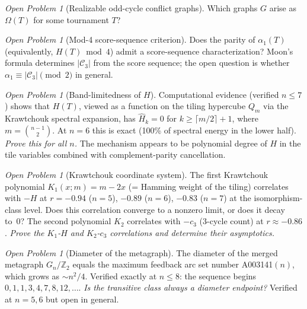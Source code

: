 \documentclass[12pt,reqno]{amsart}
\theoremstyle{plain}
\theoremstyle{definition}
\theoremstyle{remark}
\newtheorem{openquestion}[theorem]{Open Problem}
\begin{document}
\begin{openquestion}[Realizable odd-cycle conflict graphs]\label{oq:realizable}
Which graphs $G$ arise as $\Omega(T)$ for some tournament $T$?
\end{openquestion}

\begin{openquestion}[Mod-4 score-sequence criterion]\label{oq:mod4_struct}
Does the parity of $\alpha_1(T)$ (equivalently, $H(T) \bmod 4$) admit a
score-sequence characterization? Moon's formula determines $|\mathcal{C}_3|$
from the score sequence; the open question is whether
$\alpha_1 \equiv |\mathcal{C}_3| \pmod2$ in general.
\end{openquestion}

\begin{openquestion}[Band-limitedness of $H$]\label{oq:bandlimited}
Computational evidence (verified $n \leq 7$) shows that $H(T)$, viewed as a
function on the tiling hypercube $Q_m$ via the Krawtchouk spectral expansion,
has $\hat{H}_k = 0$ for $k \geq \lceil m/2 \rceil + 1$, where $m = \binom{n-1}{2}$.
At $n=6$ this is exact (100\% of spectral energy in the lower half).
\emph{Prove this for all $n$.}
The mechanism appears to be polynomial degree of $H$ in the tile variables
combined with complement-parity cancellation.
\end{openquestion}

\begin{openquestion}[Krawtchouk coordinate system]\label{oq:krawtchouk}
The first Krawtchouk polynomial $K_1(x;m) = m - 2x$ (= Hamming weight of the tiling)
correlates with $-H$ at $r = -0.94$ ($n=5$), $-0.89$ ($n=6$), $-0.83$ ($n=7$)
at the isomorphism-class level.
Does this correlation converge to a nonzero limit, or does it decay to~0?
The second polynomial $K_2$ correlates with $-c_3$ (3-cycle count) at $r \approx -0.86$.
\emph{Prove the $K_1$-$H$ and $K_2$-$c_3$ correlations and determine their asymptotics.}
\end{openquestion}

\begin{openquestion}[Diameter of the metagraph]\label{oq:diameter}
The diameter of the merged metagraph $G_n/\mathbb{Z}_2$ equals the maximum
feedback arc set number A003141$(n)$, which grows as $\sim n^2/4$.
Verified exactly at $n \leq 8$: the sequence begins $0, 1, 1, 3, 4, 7, 8, 12, \ldots$.
\emph{Is the transitive class always a diameter endpoint?}
Verified at $n=5,6$ but open in general.
\end{openquestion}
\end{document}

